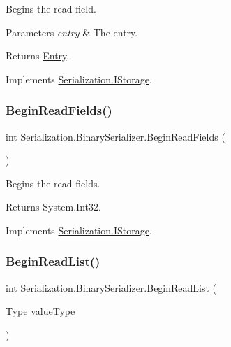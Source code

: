 Begins the read field. 


\begin{DoxyParams}{Parameters}
{\em entry} & The entry.\\
\hline
\end{DoxyParams}
\begin{DoxyReturn}{Returns}
\hyperlink{class_serialization_1_1_entry}{Entry}.
\end{DoxyReturn}


Implements \hyperlink{interface_serialization_1_1_i_storage_a369241f5ffd8446da4a57c72a8646f09}{Serialization.\+I\+Storage}.

\mbox{\label{class_serialization_1_1_binary_serializer_aa92efbd2f56eeb65e80890ed4bf3bdbe}} 
\subsubsection{\texorpdfstring{Begin\+Read\+Fields()}{BeginReadFields()}}
{\footnotesize\ttfamily int Serialization.\+Binary\+Serializer.\+Begin\+Read\+Fields (\begin{DoxyParamCaption}{ }\end{DoxyParamCaption})\hspace{0.3cm}{\ttfamily [inline]}}



Begins the read fields. 

\begin{DoxyReturn}{Returns}
System.\+Int32.
\end{DoxyReturn}


Implements \hyperlink{interface_serialization_1_1_i_storage_af7e9c21d8e723c2b7482d0ce7db7e3c5}{Serialization.\+I\+Storage}.

\mbox{\label{class_serialization_1_1_binary_serializer_ace00f8cacc0ff79bb16197d641964e4c}} 
\subsubsection{\texorpdfstring{Begin\+Read\+List()}{BeginReadList()}}
{\footnotesize\ttfamily int Serialization.\+Binary\+Serializer.\+Begin\+Read\+List (\begin{DoxyParamCaption}\item[{Type}]{value\+Type }\end{DoxyParamCaption})\hspace{0.3cm}{\ttfamily [inline]}}




